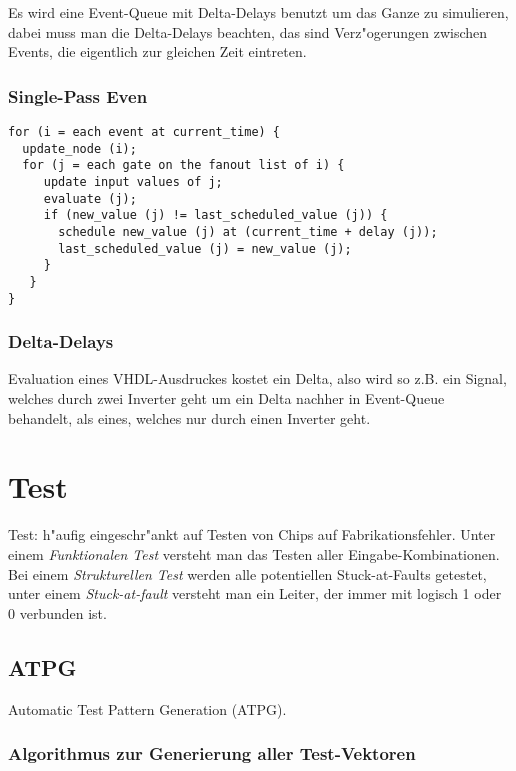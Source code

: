 \documentclass[german, 10pt, a4paper, twocolumn]{scrartcl}
\theoremstyle{definition}
\begin{document}
Es wird eine Event-Queue mit Delta-Delays benutzt um das Ganze zu simulieren, dabei muss man die Delta-Delays beachten, das sind Verz"ogerungen zwischen Events, die eigentlich zur gleichen Zeit eintreten.

\subsubsection{Single-Pass Even}

\small
\begin{verbatim}
for (i = each event at current_time) {
  update_node (i);
  for (j = each gate on the fanout list of i) {
     update input values of j;
     evaluate (j);
     if (new_value (j) != last_scheduled_value (j)) {
       schedule new_value (j) at (current_time + delay (j));
       last_scheduled_value (j) = new_value (j);
     }
   }
}
\end{verbatim}
\normalsize

\subsubsection{Delta-Delays}

Evaluation eines VHDL-Ausdruckes kostet ein Delta, also wird so z.B. ein Signal, welches durch zwei Inverter geht um ein Delta nachher in Event-Queue behandelt, als eines, welches nur durch einen Inverter geht.

\section{Test}

Test: h"aufig eingeschr"ankt auf Testen von Chips auf Fabrikationsfehler. Unter einem \textit{Funktionalen Test} versteht man das Testen aller Eingabe-Kombinationen. Bei einem \textit{Strukturellen Test} werden alle potentiellen Stuck-at-Faults getestet, unter einem \textit{Stuck-at-fault} versteht man ein Leiter, der immer mit logisch 1 oder 0 verbunden ist.

\subsection{ATPG}

Automatic Test Pattern Generation (ATPG).

\subsubsection{Algorithmus zur Generierung aller Test-Vektoren}
\end{document}
